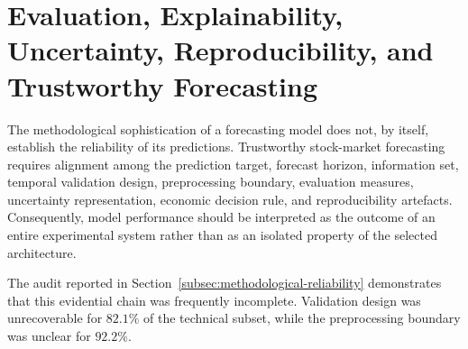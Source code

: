 \documentclass[pdflatex,sn-mathphys-num]{sn-jnl}%
\theoremstyle{thmstyleone}%
\theoremstyle{thmstyletwo}%
\theoremstyle{thmstylethree}%
\begin{document}



\section{Evaluation, Explainability, Uncertainty, Reproducibility,
and Trustworthy Forecasting}
\label{sec:trustworthy-forecasting}

The methodological sophistication of a forecasting model does not, by
itself, establish the reliability of its predictions. Trustworthy
stock-market forecasting requires alignment among the prediction
target, forecast horizon, information set, temporal validation design,
preprocessing boundary, evaluation measures, uncertainty representation,
economic decision rule, and reproducibility artefacts. Consequently,
model performance should be interpreted as the outcome of an entire
experimental system rather than as an isolated property of the selected
architecture.

The audit reported in Section~\ref{subsec:methodological-reliability} demonstrates that this evidential
chain was frequently incomplete. Validation design was unrecoverable
for \(82.1\%\) of the technical subset, while the preprocessing
boundary was unclear for \(92.2\%\).

\end{document}
